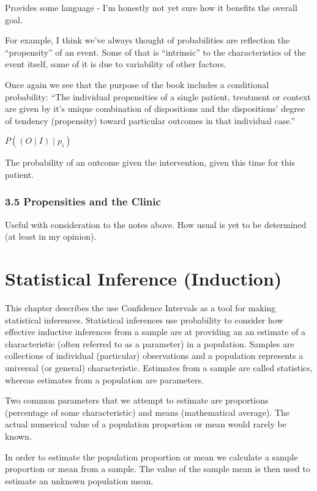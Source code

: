 \documentclass[
]{book}
\begin{document}
Provides some language - I'm honestly not yet sure how it benefits the overall goal.

For example, I think we've always thought of probabilities are reflection the ``propensity'' of an event. Some of that is ``intrinsic'' to the characteristics of the event itself, some of it is due to variability of other factors.

Once again we see that the purpose of the book includes a conditional probability: ``The individual propensities of a single patient, treatment or context are given by it's unique combination of dispositions and the dispositions' degree of tendency (propensity) toward particular outcomes in that individual case.''

\(P((O \mid I) \mid p_i)\)

The probability of an outcome given the intervention, given this time for this patient.

\hypertarget{propensities-and-the-clinic}{%
\subsection{3.5 Propensities and the Clinic}\label{propensities-and-the-clinic}}

Useful with consideration to the notes above. How usual is yet to be determined (at least in my opinion).

\hypertarget{statistical-inference-induction}{%
\chapter{Statistical Inference (Induction)}\label{statistical-inference-induction}}

This chapter describes the use Confidence Intervals as a tool for making statistical inferences. Statistical inferences use probability to consider how effective inductive inferences from a sample are at providing an an estimate of a characteristic (often referred to as a parameter) in a population. Samples are collections of individual (particular) observations and a population represents a universal (or general) characteristic. Estimates from a sample are called statistics, whereas estimates from a population are parameters.

Two common parameters that we attempt to estimate are proportions (percentage of some characteristic) and means (mathematical average). The actual numerical value of a population proportion or mean would rarely be known.

In order to estimate the population proportion or mean we calculate a sample proportion or mean from a sample. The value of the sample mean is then used to estimate an unknown population mean.
\end{document}
